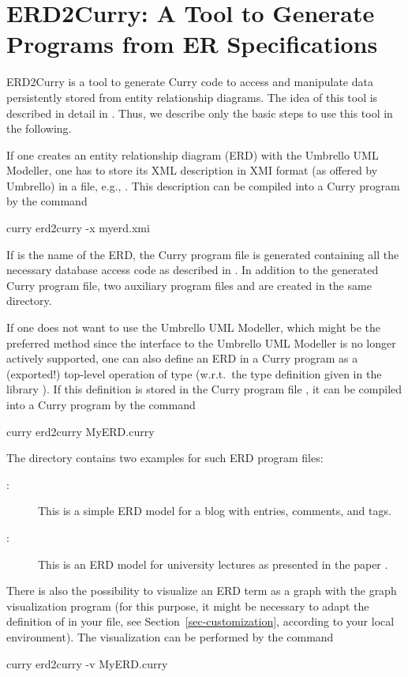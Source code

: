 \section{ERD2Curry: A Tool to Generate Programs from ER Specifications}
\label{sec-erd2curry}

ERD2Curry
is a tool to generate Curry code to access and manipulate data
persistently stored from
entity relationship diagrams.
The idea of this tool is described in detail in
\cite{BrasselHanusMueller08PADL}.
Thus, we describe only the basic steps to use this tool
in the following.

If one creates an entity relationship diagram (ERD)
with the Umbrello UML Modeller, one has to store its
XML description in XMI format (as offered by Umbrello)
in a file, e.g., .
This description can be compiled into a Curry program by the
command
\begin{curry}
curry erd2curry -x myerd.xmi
\end{curry}
If  is the name of the ERD, the Curry program file
 is generated containing all the necessary
database access code as described in \cite{BrasselHanusMueller08PADL}.
In addition to the generated Curry program file,
two auxiliary program files
 and 
are created in the same directory.

If one does not want to use the Umbrello UML Modeller,
which might be the preferred method since the interface to the
Umbrello UML Modeller is no longer actively supported,
one can also define an ERD in a Curry program as a (exported!)
top-level operation of type 
(w.r.t.\ the type definition given in the library
).
If this definition is stored in the Curry program file ,
it can be compiled into a Curry program by the
command
\begin{curry}
curry erd2curry MyERD.curry
\end{curry}
%
The directory 
contains two examples for such ERD program files:
\begin{description}
\item[:]
This is a simple ERD model for a blog with entries, comments,
and tags.
\item[:]
This is an ERD model for university lectures as
presented in the paper \cite{BrasselHanusMueller08PADL}.
\end{description}
%
There is also the possibility to visualize an ERD term
as a graph with the graph visualization program 
(for this purpose, it might be necessary to adapt the definition
of  in your \ccode{\curryrc} file,
see Section~\ref{sec-customization},
according to your local environment).
The visualization can be performed by the command
\begin{curry}
curry erd2curry -v MyERD.curry
\end{curry}

